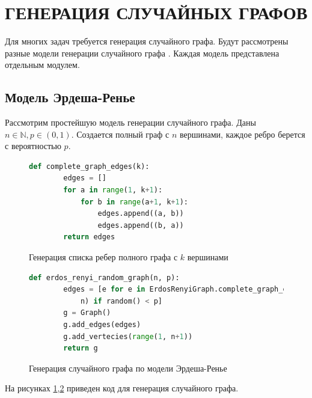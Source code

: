 \section{ГЕНЕРАЦИЯ СЛУЧАЙНЫХ ГРАФОВ}
Для многих задач требуется генерация 
случайного графа. Будут рассмотрены 
разные модели генерации случайного графа \cite{rnd}. Каждая 
модель представлена отдельным модулем.
\subsection{Модель Эрдеша-Ренье}
Рассмотрим простейшую модель генерации случайного графа. 
Даны $n \in \mathbb{N}, p \in (0,1)$. Создается 
полный граф с $n$ вершинами, каждое
ребро берется с вероятностью  $p$.

\begin{figure}[H] 
\begin{lstlisting}[language=Python] 
    def complete_graph_edges(k):
        edges = []
        for a in range(1, k+1):
            for b in range(a+1, k+1):
                edges.append((a, b))
                edges.append((b, a))
        return edges
\end{lstlisting}  
\caption{Генерация списка ребер полного графа с
$k$ вершинами}
\label{erd_1}
\end{figure}
\begin{figure}[H] 
\begin{lstlisting}[language=Python] 
    def erdos_renyi_random_graph(n, p):
        edges = [e for e in ErdosRenyiGraph.complete_graph_edges(
            n) if random() < p]
        g = Graph()
        g.add_edges(edges)
        g.add_vertecies(range(1, n+1))
        return g
\end{lstlisting}  
\caption{Генерация случайного графа по модели Эрдеша-Ренье }
\label{erd_2}
\end{figure} 
На рисунках \ref{erd_1},\ref{erd_2}
приведен код для генерация случайного графа.
